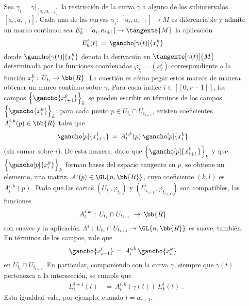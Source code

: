 Sea $\gamma_{i}=\gamma|_{[a_{i},a_{i+1}]}$ la restricci\'{o}n de la curva
$\gamma$ a alguno de los subintervalos $[a_{i},a_{i+1}]$. Cada una de las
curvas $\gamma_{i}:\,[a_{i},a_{i+1}]\rightarrow M$ es diferenciable y
admite un marco continuo: sea $E^{i}_{k}:\,%
[a_{i},a_{i+1}]\rightarrow\tangente{M}$ la aplicaci\'{o}n
\begin{align*}
	E^{i}_{k}(t) & \,=\,\gancho[\gamma(t)]{x_{i}^{k}}
\end{align*}
%
donde $\gancho[\gamma(t)]{x_{i}^{k}}$ denota la derivaci\'{o}n en
$\tangente[\gamma(t)]{M}$ determinada por las funciones coordenadas
$\varphi_{t_{i}}=(x_{i}^{l})$ correspondiente a la funci\'{o}n
$x_{i}^{k}:\,U_{t_{i}}\rightarrow\bb{R}$. La cuesti\'{o}n es c\'{o}mo
pegar estos marcos de manera obtener un marco continuo sobre $\gamma$.
Para cada \'{\i}ndice $i\in[\![0,r-1]\!]$, los campos
$\Big\{\gancho{x_{i+1}^{k}}\Big\}_{k}$ se pueden escribir en t\'{e}rminos
de los campos $\Big\{\gancho{x_{i}^{k}}\Big\}_{k}$: para cada punto
$p\in U_{t_{i}}\cap U_{t_{i+1}}$, existen coeficientes
$A^{i,k}_{l}(p)\in\bb{R}$ tales que
\begin{align*}
	\gancho[p]{x_{i+1}^{l}} & \,=\, A^{i,k}_{l}(p)\,
		\gancho[p]{x_{i}^{k}}
\end{align*}
%
(sin sumar sobre $i$). De esta manera, dado que
$\Big\{\gancho[p]{x_{i+1}^{k}}\Big\}_{k}$ y que
$\Big\{\gancho[p]{x_{i}^{k}}\Big\}_{k}$ forman bases del espacio tangente
en $p$, se obtiene un elemento, una matriz, $A^{i}(p)\in\GL{n,\bb{R}}$,
cuyo coeficiente $(k,l)$ es $A^{i,k}_{l}(p)$. Dado que las cartas
$(U_{t_{i}},\varphi_{t_{i}})$ y $(U_{t_{i+1}},\varphi_{t_{i+1}})$ son
compatibles, las funciones
\begin{align*}
	A^{i,k}_{l} & \,:\,U_{t_{i}}\cap U_{t_{i+1}} \,\rightarrow\,\bb{R}
\end{align*}
%
son suaves y la aplicaci\'{o}n $A^{i}:\,%
U_{t_{i}}\cap U_{t_{i+1}}\rightarrow\GL{n,\bb{R}}$ es suave, tambi\'{e}n.
En t\'{e}rminos de los campos, vale que
\begin{align*}
	\gancho{x_{i+1}^{l}} & \,=\,A^{i,k}_{l}\,\gancho{x_{i}^{k}}
\end{align*}
%
en $U_{t_{i}}\cap U_{t_{i+1}}$. En particular, componiendo con la curva
$\gamma$, siempre que $\gamma(t)$ pertenezca a la intersecci\'{o}n,
se cumple que
\begin{align*}
	E^{i+1}_{l}(t) & \,=\,A^{i,k}_{l}(\gamma(t))\,E^{i}_{k}(t)
	\text{ .}
\end{align*}
%
Esta igualdad vale, por ejemplo, cuando $t=a_{i+1}$.

